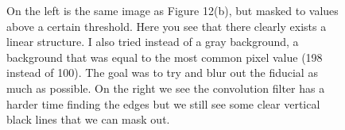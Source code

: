 \documentclass[10pt]{article}
\begin{document}
\begin{figure}[!ht]
    \centering
        \caption{On the left is the same image as Figure 12(b), but masked to values above a certain threshold. Here you see that there clearly exists a linear structure. I also tried instead of a gray background, a background that was equal to the most common pixel value (198 instead of 100). The goal was to try and blur out the fiducial as much as possible. On the right we see the convolution filter has a harder time finding the edges but we still see some clear vertical black lines that we can mask out.}
\end{figure}
\end{document}
